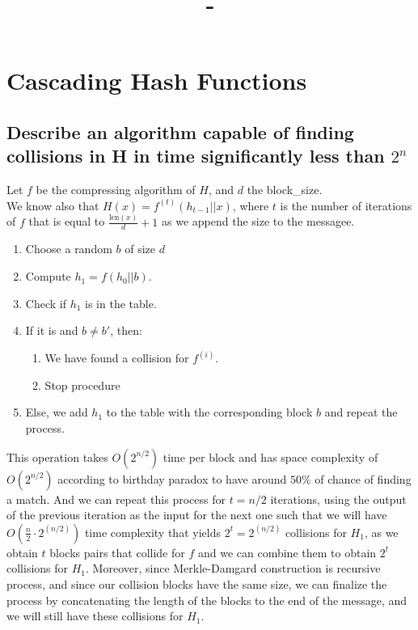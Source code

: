 \documentclass{article}
\date{}
\title{\textit{\course} - \labName}
\author{\me}
\begin{document}
\maketitle
\section{Cascading Hash Functions}
\subsection{Describe an algorithm capable of finding collisions in H in time significantly less than $2^{n}$}
Let $f$ be the compressing algorithm of $H$, and $d$ the block\_size.\\
We know also that $H(x) = f^{(t)}(h_{t-1} || x)$, where $t$ is the number of iterations of $f$ that is equal to $\frac{\text{len}(x)}{d} + 1$ as we append the size to the messagee.
\begin{enumerate}
    \item Choose a random $b$ of size $d$
    \item Compute $h_1 = f(h_0 || b)$.
    \item Check if $h_1$ is in the table.
    \item If it is and $b \neq b'$, then:
        \begin{enumerate}
            \item We have found a collision for $f^{(i)}$.
            \item Stop procedure
        \end{enumerate}
    \item Else, we add $h_1$ to the table with the corresponding block $b$ and repeat the process.
\end{enumerate}

This operation takes $O(2^{n/2})$ time per block and has space complexity of $O(2^{n/2})$ according to birthday paradox to have around $50\%$ of chance of finding a match.
And we can repeat this process for $t=n/2$ iterations, using the output of the previous iteration as the input for the next one such that we will have $O(\frac{n}{2} \cdot 2^{(n/2)})$ time complexity that yields $2^{t} = 2^{(n/2)}$ collisions for $H_1$, as we obtain $t$ blocks pairs that collide for $f$ and we can combine them to obtain $2^{t}$ collisions for $H_1$. Moreover, since Merkle-Damgard construction is recursive process, and since our collision blocks have the same size, we can finalize the process by concatenating the length of the blocks to the end of the message, and we will still have these collisions for $H_1$.
\end{document}
